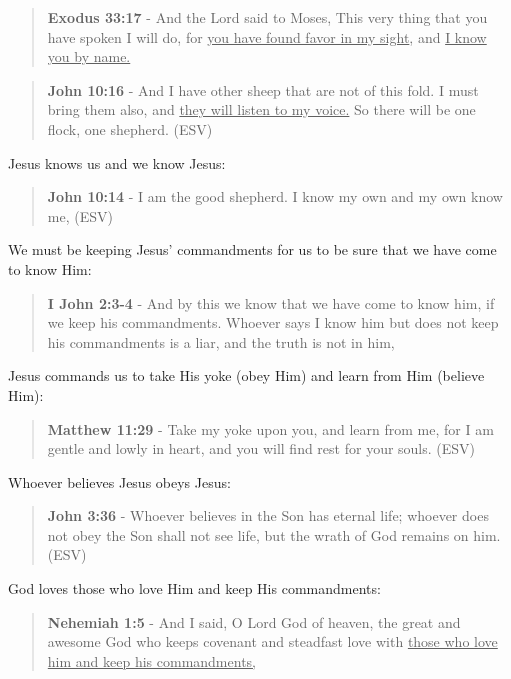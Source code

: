 \documentclass[11pt]{article}
\begin{document}
\begin{quote}
\textbf{Exodus 33:17} - And the Lord said to Moses, This very thing that you have spoken I will do, for \uline{you have found favor in my sight}, and \uline{I know you by name.}
\end{quote}

\begin{quote}
\textbf{John 10:16} - And I have other sheep that are not of this fold. I must bring them also, and \uline{they will listen to my voice.} So there will be one flock, one shepherd. (ESV)
\end{quote}

Jesus knows us and we know Jesus:

\begin{quote}
\textbf{John 10:14} - I am the good shepherd. I know my own and my own know me, (ESV)
\end{quote}

We must be keeping Jesus' commandments for us to be sure that we have come to know Him:

\begin{quote}
\textbf{I John 2:3-4} - And by this we know that we have come to know him, if we keep his commandments. Whoever says I know him but does not keep his commandments is a liar, and the truth is not in him,
\end{quote}

Jesus commands us to take His yoke (obey Him) and learn from Him (believe Him):

\begin{quote}
\textbf{Matthew 11:29} - Take my yoke upon you, and learn from me, for I am gentle and lowly in heart, and you will find rest for your souls. (ESV)
\end{quote}

Whoever believes Jesus obeys Jesus:

\begin{quote}
\textbf{John 3:36} - Whoever believes in the Son has eternal life; whoever does not obey the Son shall not see life, but the wrath of God remains on him. (ESV)
\end{quote}

God loves those who love Him and keep His commandments:

\begin{quote}
\textbf{Nehemiah 1:5} - And I said, O Lord God of heaven, the great and awesome God who keeps covenant and steadfast love with \uline{those who love him and keep his commandments,}
\end{quote}
\end{document}
